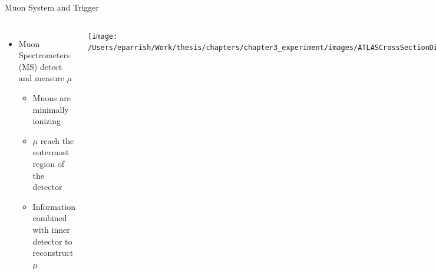 \documentclass[aspectratio=169,xcolor=table]{beamer}
\begin{document}
    \begin{frame}[t]{Muon System and Trigger}
     \begin{columns}[t]
        \begin{itemize}
          \item Muon Spectrometers (MS) detect and measure $\mu$
          \begin{itemize}
            \item Muons are minimally ionizing
            \item $\mu$ reach the outermost region of the detector
            \item Information combined with inner detector to reconstruct $\mu$
          \end{itemize}
        \end{itemize}

      \vspace{-.4cm}
      \begin{columns}
        \centering
        \texttt{[image: /Users/eparrish/Work/thesis/chapters/chapter3\_experiment/images/ATLASCrossSectionDiagram.png]}
        \centering
        \begin{figure}
          \texttt{[image: /Users/eparrish/Work/thesis/chapters/chapter3\_experiment/images/ATLAS\_Muon\_System\_Run2.png]}
          \caption{\tiny \cite{atlas-schematics}}
        \end{figure}
      \end{columns}

      \centering
      \begin{itemize}
        \item Trigger System
        \begin{itemize}
          \item Need to quickly sort through data and decide if a collision is interesting or not
          \item Mix of hardware and software
        \end{itemize}
      \end{itemize}
        \begin{figure}
          \centering
          \texttt{[image: /Users/eparrish/Work/thesis/chapters/chapter3\_experiment/images/tdaq-run2-schematic2017.png]}
          \caption{\tiny \cite{TDAQ_Diagram}}
        \end{figure}

      \end{columns}
    \end{frame}
\end{document}
